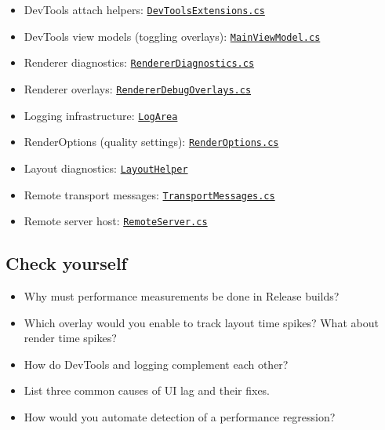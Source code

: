\begin{itemize}
\tightlist
\item
  DevTools attach helpers:
  \href{https://github.com/AvaloniaUI/Avalonia/blob/master/src/Avalonia.Diagnostics/DevToolsExtensions.cs}{\passthrough{\lstinline!DevToolsExtensions.cs!}}
\item
  DevTools view models (toggling overlays):
  \href{https://github.com/AvaloniaUI/Avalonia/blob/master/src/Avalonia.Diagnostics/Diagnostics/ViewModels/MainViewModel.cs}{\passthrough{\lstinline!MainViewModel.cs!}}
\item
  Renderer diagnostics:
  \href{https://github.com/AvaloniaUI/Avalonia/blob/master/src/Avalonia.Base/Rendering/RendererDiagnostics.cs}{\passthrough{\lstinline!RendererDiagnostics.cs!}}
\item
  Renderer overlays:
  \href{https://github.com/AvaloniaUI/Avalonia/blob/master/src/Avalonia.Base/Rendering/RendererDebugOverlays.cs}{\passthrough{\lstinline!RendererDebugOverlays.cs!}}
\item
  Logging infrastructure:
  \href{https://github.com/AvaloniaUI/Avalonia/blob/master/src/Avalonia.Logging/LogArea.cs}{\passthrough{\lstinline!LogArea!}}
\item
  RenderOptions (quality settings):
  \href{https://github.com/AvaloniaUI/Avalonia/blob/master/src/Avalonia.Base/Media/RenderOptions.cs}{\passthrough{\lstinline!RenderOptions.cs!}}
\item
  Layout diagnostics:
  \href{https://github.com/AvaloniaUI/Avalonia/blob/master/src/Avalonia.Base/Layout/LayoutHelper.cs}{\passthrough{\lstinline!LayoutHelper!}}
\item
  Remote transport messages:
  \href{https://github.com/AvaloniaUI/Avalonia/blob/master/src/Avalonia.Remote.Protocol/TransportMessages.cs}{\passthrough{\lstinline!TransportMessages.cs!}}
\item
  Remote server host:
  \href{https://github.com/AvaloniaUI/Avalonia/blob/master/src/Avalonia.Controls/Remote/RemoteServer.cs}{\passthrough{\lstinline!RemoteServer.cs!}}
\end{itemize}

\subsection{Check yourself}\label{check-yourself-22}

\begin{itemize}
\tightlist
\item
  Why must performance measurements be done in Release builds?
\item
  Which overlay would you enable to track layout time spikes? What about
  render time spikes?
\item
  How do DevTools and logging complement each other?
\item
  List three common causes of UI lag and their fixes.
\item
  How would you automate detection of a performance regression?
\end{itemize}

